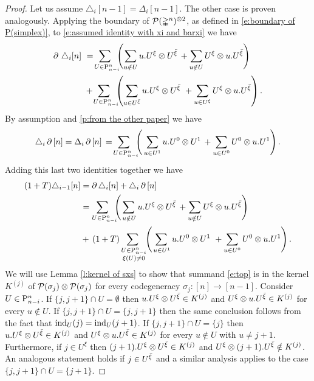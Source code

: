 \begin{proof}
	Let us assume $\triangle_i [n-1] = \Delta_i [n-1]$.
	The other case is proven analogously.
	Applying the boundary of $\cP(\simplex^n)^{\ot 2}$, as defined in \cref{e:boundary of P(simplex)}, to \cref{e:assumed identity with xi and barxi}	we have
	\begin{align*}
	\bd \, \triangle_i [n]\ & =\!
	\sum_{U \in \P_{n-i}^n \kern-5pt} \left(\sum_{u \notin U} {u.U^\xi} \ot {U^\barxi} \, +
	\sum_{u \notin U} {U^\xi} \ot {u.U^\barxi} \right) \\ & +\!
	\sum_{U \in \P_{n-i}^n \kern-5pt} \left(\sum_{u \in U^\barxi} {u.U^\xi} \ot {U^\barxi} \ +
	\sum_{u \in U^{\xi}} {U^\xi} \ot {u.U^\barxi} \right).
	\end{align*}
	By assumption and \cref{p:from the other paper} we have
	\[
	\triangle_i \bd \, [n] =
	\Delta_i \bd \, [n] \, = \!
	\sum_{U \in \P_{n-i}^n \kern-5pt} \left( \,
	\sum_{u \in U^1} {u.U^0} \ot {U^1} \, +
	\sum_{u \in U^0} {U^0} \ot {u.U^1} \right).
	\]
	Adding this last two identities together we have
	\begin{align}
	(1+T) \triangle_{i-1} [n] &= \bd \triangle_i [n] + \triangle_i \bd \, [n] \\ &=
	\label{e:top} \sum_{U \in \P_{n-i}^n \kern-5pt} \left(
	\sum_{\,u \notin U} u.U^\xi \ot U^\barxi \, +
	\sum_{u \notin U} U^\xi \ot u.U^\barxi \right) \\ &+ \,
	\label{e:bottom} (1+T) \sum_{\substack{U \in \P_{n-i}^n \\ \xi(U) \neq 0} \kern-3pt} \left(
	\sum_{\,u \in U^1} {u.U^0} \ot {U^1} \ +
	\sum_{u \in U^0} {U^0} \ot {u.U^1} \right).
	\end{align}
	We will use Lemma \ref{l:kernel of sxs} to show that summand \eqref{e:top} is in the kernel $K^{(j)}$ of $\cP(\sigma_j) \ot \cP(\sigma_j)$ for every codegeneracy $\sigma_j \colon [n] \to [n-1]$.
	Consider $U \in \P_{n-i}^n$.
	If $\{j, j+1\} \cap U = \emptyset$ then $u.U^\xi \ot U^\barxi \in K^{(j)}$ and $U^\xi \ot u.U^\barxi \in K^{(j)}$ for every $u \notin U$.
	If $\{j, j+1\} \cap U = \{j, j+1\}$ then the same conclusion follows from the fact that $\ind_U(j) = \ind_U(j+1)$.
	If $\{j, j+1\} \cap U = \{j\}$ then $u.U^\xi \ot U^\barxi \in K^{(j)}$ and $U^\xi \ot u.U^\barxi \in K^{(j)}$ for every $u \notin U$ with $u \neq j+1$.
	Furthermore, if $j \in U^\xi$ then $(j+1).U^\xi \ot U^\barxi \in K^{(j)}$ and $U^\xi \ot (j+1).U^\barxi \notin K^{(j)}$.
	An analogous statement holds if $j \in U^\barxi$ and a similar analysis applies to the case $\{j, j+1\} \cap U = \{j+1\}$.

\end{proof}
